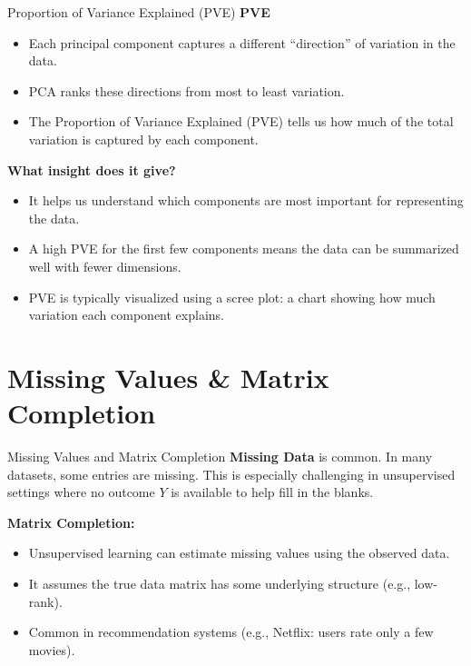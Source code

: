 \documentclass[aspectratio=169,xcolor=dvipsnames]{beamer}
\begin{document}
\begin{frame}{Proportion of Variance Explained (PVE)}
  \textbf{PVE}
  \begin{itemize}
    \item Each principal component captures a different “direction” of variation in the data.
    \item PCA ranks these directions from most to least variation.
    \item The Proportion of Variance Explained (PVE) tells us how much of the total variation is captured by each component.
  \end{itemize}

  \vspace{0.3cm}
  \textbf{What insight does it give?}
  \begin{itemize}
    \item It helps us understand which components are most important for representing the data.
    \item A high PVE for the first few components means the data can be summarized well with fewer dimensions.
    \item PVE is typically visualized using a scree plot: a chart showing how much variation each component explains.
  \end{itemize}
\end{frame}

\section{Missing Values \& Matrix Completion}
\begin{frame}{Missing Values and Matrix Completion}
  \textbf{Missing Data} is common. In many datasets, some entries are missing. This is especially challenging in unsupervised settings where no outcome $Y$ is available to help fill in the blanks.


  \vspace{1cm}
  \textbf{Matrix Completion:}
  \begin{itemize}
    \item Unsupervised learning can estimate missing values using the observed data.
    \item It assumes the true data matrix has some underlying structure (e.g., low-rank).
    \item Common in recommendation systems (e.g., Netflix: users rate only a few movies).
  \end{itemize}
  \end{frame}
\end{document}
